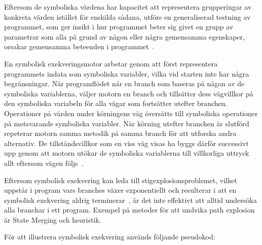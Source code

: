 Eftersom de symboliska värdena har kapacitet att representera grupperingar av konkreta
värden istället för enskilda sådana, utförs en generaliserad testning av programmet,
som ger insikt i hur programmet beter sig givet en grupp av parametrar som alla
på grund av någon eller några gemensamma egenskaper, orsakar gemensamma beteenden
i programmet~\cite{Cadar}.

En symbolisk exekveringsmotor arbetar genom att först representera programmets
indata som symboliska variabler, vilka vid starten inte har några begränsningar.
När programflödet når en branch som baseras på någon av de symboliska
variablerna, väljer motorn en branch och tillsätter dess vägvillkor på den
symboliska variabeln för alla vägar som fortsätter utefter branchen. Operationer
på värden under körningens väg översätts till symboliska operationer på
motsvarande symboliska variabler. När körning utefter branchen är
slutförd repeterar motorn samma metodik på samma branch för att utforska andra
alternativ. De tillståndsvillkor som en viss väg visas ha byggs därför
successivt upp genom att motorn utökar de symboliska variablerna till
villkorliga uttryck allt eftersom vägen följs~\cite{klee}.

Eftersom symbolisk exekvering kan leda till stigexplosionsproblemet, vilket
uppstår i program vars branches växer exponentiellt och resulterar i att en
symbolisk exekvering aldrig terminerar~\cite{path_explo}, är det inte effektivt
att alltid undersöka alla branchar i ett program. Exempel på metoder för att
undvika path explosion är State Merging och heuristik.

För att illustrera symbolisk exekvering används följande pseudokod:

